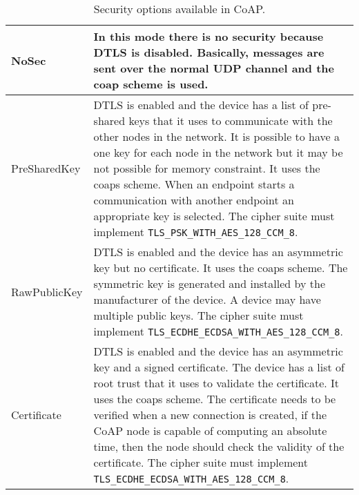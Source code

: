 	\begin{table}[h!]
		\begin{center}
			\begin{tabularx}{\textwidth}{|l|X|}
				\hline
				NoSec & In this mode there is no security because DTLS is disabled.
				Basically, messages are sent over the normal UDP channel and the coap scheme is used.\\\hline
				PreSharedKey & DTLS is enabled and the device has a list of pre-shared keys that it uses to communicate with the other nodes in the network.
				It is possible to have a one key for each node in the network but it may be not possible for memory constraint.
				It uses the coaps scheme.
				When an endpoint starts a communication with another endpoint an appropriate key is selected.
				The cipher suite must implement \texttt{TLS\_PSK\_WITH\_AES\_128\_CCM\_8}.\\\hline
				RawPublicKey & DTLS is enabled and the device has an asymmetric key but no certificate.
				It uses the coaps scheme.
				The symmetric key is generated and installed by the manufacturer of the device.
				A device may have multiple public keys.
				The cipher suite must implement \texttt{TLS\_ECDHE\_ECDSA\_WITH\_AES\_128\_CCM\_8}.\\\hline
				Certificate & DTLS is enabled and the device has an asymmetric key and a signed certificate.
				The device has a list of root trust that it uses to validate the certificate.
				It uses the coaps scheme.
				The certificate needs to be verified when a new connection is created, if the CoAP node is capable of computing an absolute time, then the node should check the validity of the certificate.
				The cipher suite must implement \texttt{TLS\_ECDHE\_ECDSA\_WITH\_AES\_128\_CCM\_8}.\\\hline
				
				
			\end{tabularx}
			\caption{Security options available in CoAP.}
			\label{tab:table10}
		\end{center}
	\end{table}